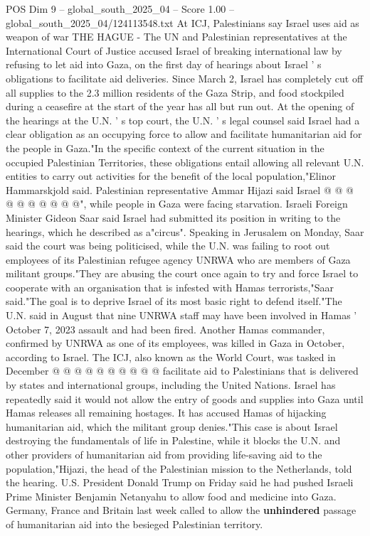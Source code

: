 \begin{textsample}{POS Dim 9 – global\_south\_2025\_04 – Score 1.00 – global\_south\_2025\_04/124113548.txt}  \label{ex:f9_pos_189}
At ICJ, Palestinians say Israel uses aid as weapon of war THE HAGUE - The UN and Palestinian representatives at the International Court of Justice accused Israel of breaking international law by refusing to let aid into Gaza, on the first day of hearings about Israel ' s obligations to facilitate aid deliveries.
Since March 2, Israel has completely cut off all supplies to the 2.3 million residents of the Gaza Strip, and food stockpiled during a ceasefire at the start of the year has all but run out.
At the opening of the hearings at the U.N. ' s top court, the U.N. ' s legal counsel said Israel had a clear obligation as an occupying force to allow and facilitate humanitarian aid for the people in Gaza."In the specific context of the current situation in the occupied Palestinian Territories, these obligations entail allowing all relevant U.N. entities to carry out activities for the benefit of the local population,"Elinor Hammarskjold said.
Palestinian representative Ammar Hijazi said Israel @ @ @ @ @ @ @ @ @ @", while people in Gaza were facing starvation.
Israeli Foreign Minister Gideon Saar said Israel had submitted its position in writing to the hearings, which he described as a"circus".
Speaking in Jerusalem on Monday, Saar said the court was being politicised, while the U.N. was failing to root out employees of its Palestinian refugee agency UNRWA who are members of Gaza militant groups."They are abusing the court once again to try and force Israel to cooperate with an organisation that is infested with Hamas terrorists,"Saar said."The goal is to deprive Israel of its most basic right to defend itself."The U.N. said in August that nine UNRWA staff may have been involved in Hamas ' October 7, 2023 assault and had been fired.
Another Hamas commander, confirmed by UNRWA as one of its employees, was killed in Gaza in October, according to Israel.
The ICJ, also known as the World Court, was tasked in December @ @ @ @ @ @ @ @ @ @ facilitate aid to Palestinians that is delivered by states and international groups, including the United Nations.
Israel has repeatedly said it would not allow the entry of goods and supplies into Gaza until Hamas releases all remaining hostages.
It has accused Hamas of hijacking humanitarian aid, which the militant group denies."This case is about Israel destroying the fundamentals of life in Palestine, while it blocks the U.N. and other providers of humanitarian aid from providing life-saving aid to the population,"Hijazi, the head of the Palestinian mission to the Netherlands, told the hearing.
U.S.
President Donald Trump on Friday said he had pushed Israeli Prime Minister Benjamin Netanyahu to allow food and medicine into Gaza.
Germany, France and Britain last week called to allow the \textbf{unhindered} passage of humanitarian aid into the besieged Palestinian territory.

\end{textsample}
